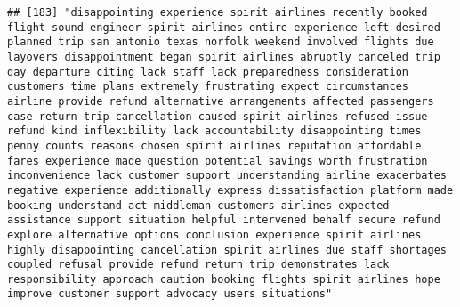 \documentclass[
]{article}
\begin{document}
\begin{verbatim}
## [183] "disappointing experience spirit airlines recently booked flight sound engineer spirit airlines entire experience left desired planned trip san antonio texas norfolk weekend involved flights due layovers disappointment began spirit airlines abruptly canceled trip day departure citing lack staff lack preparedness consideration customers time plans extremely frustrating expect circumstances airline provide refund alternative arrangements affected passengers case return trip cancellation caused spirit airlines refused issue refund kind inflexibility lack accountability disappointing times penny counts reasons chosen spirit airlines reputation affordable fares experience made question potential savings worth frustration inconvenience lack customer support understanding airline exacerbates negative experience additionally express dissatisfaction platform made booking understand act middleman customers airlines expected assistance support situation helpful intervened behalf secure refund explore alternative options conclusion experience spirit airlines highly disappointing cancellation spirit airlines due staff shortages coupled refusal provide refund return trip demonstrates lack responsibility approach caution booking flights spirit airlines hope improve customer support advocacy users situations"                                                                                                                                                                                                                                                                                                                                                                                                                              

\end{verbatim}
\end{document}
